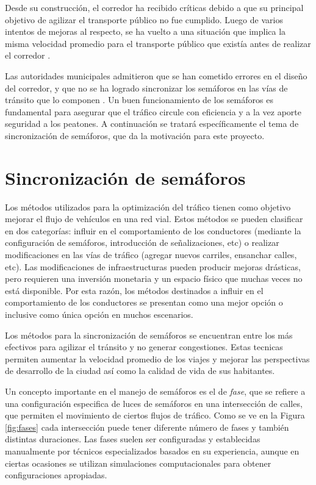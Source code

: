 Desde su construcción, el corredor ha recibido críticas debido a que su principal objetivo de agilizar el transporte público no fue cumplido. Luego de varios intentos de mejoras al respecto, se ha vuelto a una situación que implica la misma velocidad promedio para el transporte público que existía antes de realizar el corredor \citep{olivera2015}.

Las autoridades municipales admitieron que se han cometido errores en el diseño del corredor, y que no se ha logrado sincronizar los semáforos en las vías de tránsito que lo componen \citep{olivera2013}. Un buen funcionamiento de los semáforos es fundamental para asegurar que el tráfico circule con eficiencia y a la vez aporte seguridad a los peatones. A continuación se tratará específicamente el tema de sincronización de semáforos, que da la motivación para este proyecto. 


\section{Sincronización de semáforos}
Los métodos utilizados para la optimización del tráfico tienen como objetivo mejorar el flujo de vehículos en una red vial. Estos métodos se pueden clasificar en dos categorías: influir en el comportamiento de los conductores (mediante la configuración de semáforos, introducción de señalizaciones, etc) o realizar modificaciones en las vías de tráfico (agregar nuevos carriles, ensanchar calles, etc). Las modificaciones de infraestructuras pueden producir mejoras drásticas, pero requieren una inversión monetaria y un espacio físico que muchas veces no está disponible. Por esta razón, los métodos destinados a influir en el comportamiento de los conductores se presentan como una mejor opción o inclusive como única opción en muchos escenarios.

Los métodos para la sincronización de semáforos se encuentran entre los más efectivos para agilizar el tránsito y no generar congestiones. Estas tecnicas permiten aumentar la velocidad promedio de los viajes y mejorar las perspectivas de desarrollo de la ciudad así como la calidad de vida de sus habitantes. 

Un concepto importante en el manejo de semáforos es el de \emph{fase}, que se refiere a una configuración especifica de luces de semáforos en una intersección de calles, que permiten el movimiento de ciertos flujos de tráfico. Como se ve en la Figura \ref{fig:fases} cada intersección puede tener diferente número de fases y también distintas duraciones. Las fases suelen ser configuradas y establecidas manualmente por técnicos especializados basados en su experiencia, aunque en ciertas ocasiones se utilizan simulaciones computacionales para obtener configuraciones apropiadas. 

